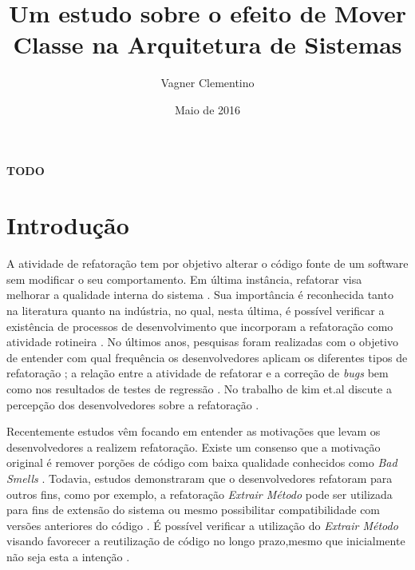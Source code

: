 \documentclass[12pt]{article}
\title{Um estudo sobre o efeito de Mover Classe na Arquitetura de Sistemas}
\author{Vagner Clementino\inst{1}}
\date{Maio de 2016}
\begin{document}
\maketitle


\begin{resumo}
 \textbf{TODO}
\end{resumo}


\section{Introdução}
\label{sec:intro}

A atividade de refatoração tem por objetivo alterar o código fonte de um software sem modificar o seu comportamento. Em última instância, refatorar visa melhorar a qualidade interna do sistema \cite{Fowler1999,Opdyke:1992:ROF:169783}. Sua importância é reconhecida tanto na literatura quanto na indústria, no qual, nesta última, é possível verificar a existência de processos de desenvolvimento que incorporam a refatoração como atividade rotineira \cite{Beck:2000:PEP:557458}. No últimos anos, pesquisas foram realizadas com o objetivo de entender com qual frequência os desenvolvedores aplicam os diferentes tipos de refatoração \cite{Murphy-Hill:2009:WRW:1555001.1555044}; a relação entre a atividade de refatorar e a correção de \textit{bugs}\cite{Kim:2011:EIR:1985793.1985815} bem como nos resultados de testes de regressão  \cite{Kim:2012:EII:2473496.2473590}. No trabalho de kim et.al discute a percepção dos desenvolvedores sobre a refatoração \cite{Kim:2012:FSR:2393596.2393655}.

Recentemente estudos vêm focando em entender as motivações que levam os desenvolvedores a realizem refatoração. Existe um consenso que a motivação original é remover porções de código com baixa qualidade conhecidos como \textit{Bad Smells} \cite{Fowler1999}. Todavia, estudos demonstraram que o desenvolvedores refatoram para outros fins, como por exemplo, a refatoração \textit{Extrair Método}  pode ser utilizada para fins de extensão do sistema ou mesmo possibilitar compatibilidade com versões anteriores do código \cite{Tsantalis2013}. É possível verificar a utilização do \textit{Extrair Método} visando favorecer a reutilização de código no longo prazo,mesmo que inicialmente não seja esta a intenção \cite{Danilo}.
\end{document}

